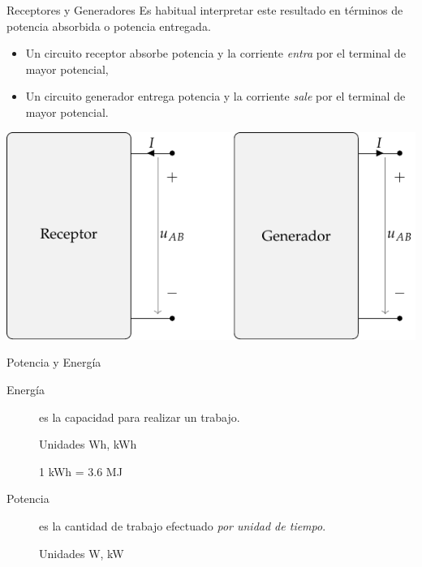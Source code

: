 \documentclass[xcolor={usenames,svgnames,dvipsnames}]{beamer}
\begin{document}
\begin{frame}[label={sec:org6ac667a}]{Receptores y Generadores}
Es habitual \alert{interpretar} este resultado en términos de potencia absorbida o potencia entregada. 
\begin{itemize}
\item Un \alert{circuito receptor absorbe potencia} y la corriente \emph{entra} por el terminal de mayor potencial,
\item Un \alert{circuito generador entrega potencia} y la corriente \emph{sale} por el terminal de mayor potencial.
\end{itemize}

\begin{center}
\includegraphics[height=0.5\textheight]{figs/receptor_generador.pdf}
\end{center}
\end{frame}

\begin{frame}[label={sec:orgb4bffa6}]{Potencia y Energía}
\begin{description}
\item[{Energía}] es la capacidad para realizar un trabajo.

Unidades Wh, kWh

1 kWh = 3.6 MJ

\item[{Potencia}] es la cantidad de trabajo efectuado \emph{por unidad de
tiempo}.

Unidades W, kW
\end{description}
\end{frame}
\end{document}
